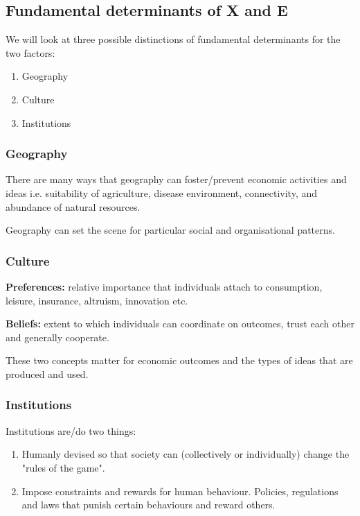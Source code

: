 \documentclass[11pt]{article}
\begin{document}
\subsection{Fundamental determinants of X and E}

We will look at three possible distinctions of fundamental determinants for the two factors:
\begin{enumerate}
    \item Geography
    \item Culture
    \item Institutions
\end{enumerate}

\subsubsection{Geography}

There are many ways that geography can foster/prevent economic activities and ideas i.e. suitability of agriculture, disease environment, connectivity, and abundance of natural resources. 

Geography can set the scene for particular social and organisational patterns.

\subsubsection{Culture}
\textbf{Preferences:} relative importance that individuals attach to consumption, leisure, insurance, altruism, innovation etc.

\textbf{Beliefs:} extent to which individuals can coordinate on outcomes, trust each other and generally cooperate.

These two concepts matter for economic outcomes and the types of ideas that are produced and used.

\subsubsection{Institutions}

Institutions are/do two things:
\begin{enumerate}
    \item Humanly devised so that society can (collectively or individually) change the "rules of the game".

    \item Impose constraints and rewards for human behaviour. Policies, regulations and laws that punish certain behaviours and reward others.
\end{enumerate}
\end{document}
